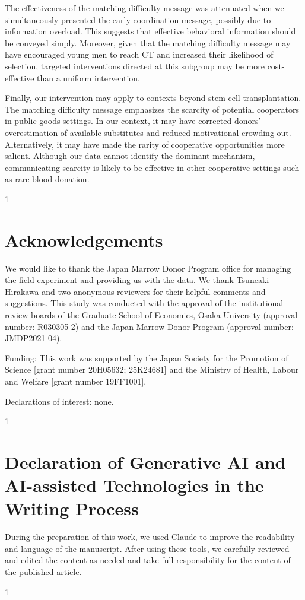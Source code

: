 \documentclass[12pt, a4paper]{article}
\begin{document}
The effectiveness of the matching difficulty message was attenuated when we simultaneously presented the early coordination message, possibly due to information overload. This suggests that effective behavioral information should be conveyed simply. Moreover, given that the matching difficulty message may have encouraged young men to reach CT and increased their likelihood of selection, targeted interventions directed at this subgroup may be more cost-effective than a uniform intervention.

Finally, our intervention may apply to contexts beyond stem cell transplantation. The matching difficulty message emphasizes the scarcity of potential cooperators in public-goods settings. In our context, it may have corrected donors' overestimation of available substitutes and reduced motivational crowding-out. Alternatively, it may have made the rarity of cooperative opportunities more salient. Although our data cannot identify the dominant mechanism, communicating scarcity is likely to be effective in other cooperative settings such as rare-blood donation.

\begin{spacing}{1}
  \section*{Acknowledgements}
  We would like to thank the Japan Marrow Donor Program office for managing the field experiment and providing us with the data. We thank Tsuneaki Hirakawa and two anonymous reviewers for their helpful comments and suggestions. This study was conducted with the approval of the institutional review boards of the Graduate School of Economics, Osaka University (approval number: R030305-2) and the Japan Marrow Donor Program (approval number: JMDP2021-04).

  \vspace{0.5em}

  \noindent
  Funding: This work was supported by the Japan Society for the Promotion of Science {[}grant number 20H05632; 25K24681{]} and the Ministry of Health, Labour and Welfare {[}grant number 19FF1001{]}.

  \vspace{0.5em}

  \noindent
  Declarations of interest: none.
\end{spacing}
\begin{spacing}{1}
  \section*{Declaration of Generative AI and AI-assisted Technologies in the Writing Process}
  During the preparation of this work, we used Claude to improve the readability and language of the manuscript. After using these tools, we carefully reviewed and edited the content as needed and take full responsibility for the content of the published article.
\end{spacing}
\begin{spacing}{1}
  
\end{spacing}
\end{document}
